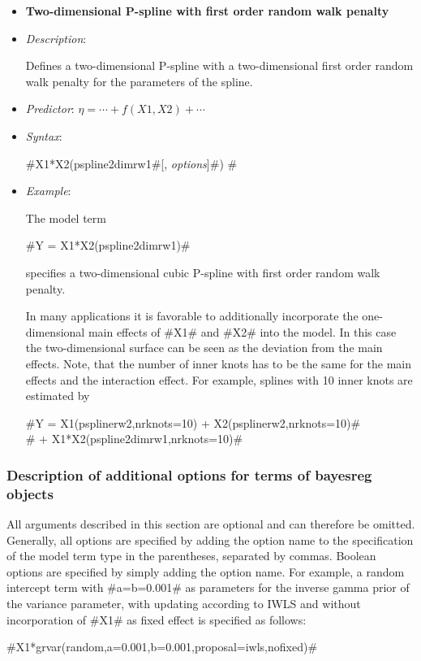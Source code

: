 \begin{itemize}
\item[] {\bf\sffamily Two-dimensional P-spline with first order
random walk penalty}

\item[] {\em Description}:

Defines a two-dimensional P-spline with a two-dimensional first
order random walk penalty for the parameters of the spline.
\item[] {\em Predictor}: $\eta= \cdots + f(X1,X2) + \cdots$
\item[] {\em Syntax}:

#X1*X2(pspline2dimrw1#[, {\em options}]#) #
\item[] {\em Example}:

The model term

#Y = X1*X2(pspline2dimrw1)#

specifies a two-dimensional cubic P-spline with first order random
walk penalty.

In many applications it is favorable to additionally incorporate
the one-dimensional main effects of #X1# and #X2# into the model.
In this case the two-dimensional surface can be seen as the
deviation from the main effects. Note, that the number of inner
knots has to be the same for the main effects and the interaction
effect. For example, splines with 10 inner knots are estimated by


 #Y = X1(psplinerw2,nrknots=10) + X2(psplinerw2,nrknots=10)#\\
 #    + X1*X2(pspline2dimrw1,nrknots=10)#
\end{itemize}

\subsubsection{Description of additional options for terms of bayesreg objects}
\label{localoptions}

All arguments described in this section are optional and can
therefore be omitted. Generally, all options are specified by
adding the option name to the specification of the model term type
in the parentheses, separated by commas. Boolean options are
specified by simply adding the option name. For example, a random
intercept term with #a=b=0.001# as parameters for the inverse
gamma prior of the variance parameter, with updating according to
IWLS and without incorporation of #X1# as fixed effect is
specified as follows:

#X1*grvar(random,a=0.001,b=0.001,proposal=iwls,nofixed)#

